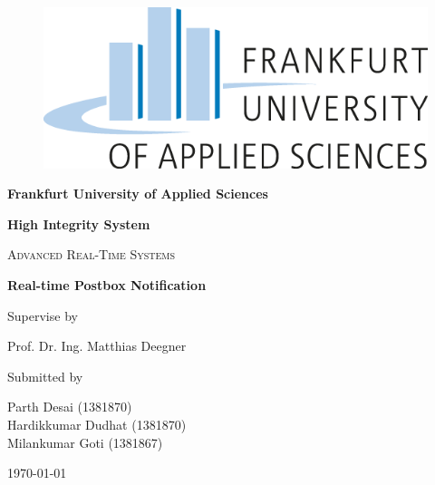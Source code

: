 \begin{titlepage}
    \begin{center}
        \vspace*{0cm}
        
        \begin{figure}[h]
        \begin{center}
        \includegraphics[width=.3\columnwidth]{image/Logofrauas.png}
        \end{center}
        \end{figure}
        \vspace*{1cm}
        
        \vspace{1cm}       
        {\Large \textbf{Frankfurt University of Applied Sciences}}
        \vspace{1cm}
        
        {\Large \textbf{High Integrity System}}
        \vspace{1cm}
        
        \LARGE
        \textsc{Advanced Real-Time Systems}
        \vspace{1cm}
                
        \Huge
        \textbf{Real-time Postbox Notification}
        \vspace{1.5cm}
        
        
        \large 
        Supervise by
        \vspace{.3cm}
        
        \Large 
        Prof. Dr. Ing. Matthias Deegner
        \vspace{1cm}
        
        
        \large 
        Submitted by
        \vspace{.3cm}
        
        \LARGE
        Parth Desai (1381870)
        \\Hardikkumar Dudhat (1381870)
        \\Milankumar Goti (1381867)
        \vspace{0.5cm}

        
     
        \vfill
        {\small \monthyeardate\today}
        
            
        \vspace*{0cm}
        
    \end{center}
\end{titlepage}
